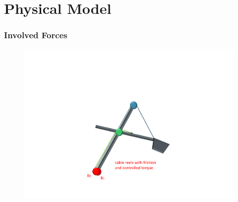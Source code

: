 \documentclass{beamer}
\begin{document}

\section{Physical Model}

\begin{frame}
	\frametitle{Involved Forces}
	\begin{figure}[bth]
	  \begin{center}
	    \includegraphics[trim=22cm 5cm 2cm 24cm, clip=true, 
	    width=\linewidth]{Exc/Excavator_Only1}
	  \end{center}
	\end{figure}

\end{frame}
\end{document}
